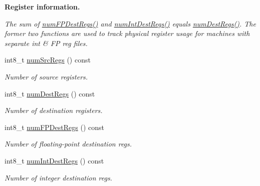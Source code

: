 \begin{Indent}{\bf Register information.}\par
{\em \label{_amgrp94a7efef3e08518a5eecac7cdd492527}
 The sum of \hyperlink{classStaticInst_a7ec0ad00d322ae83bc5fae443ef04323}{numFPDestRegs()} and \hyperlink{classStaticInst_a3935410f8201e0afd0f8e459f838b463}{numIntDestRegs()} equals \hyperlink{classStaticInst_ab7e23352b3d45a982dfeb799030f87d0}{numDestRegs()}. The former two functions are used to track physical register usage for machines with separate int \& FP reg files. }\begin{DoxyCompactItemize}
\item 
int8\_\-t \hyperlink{classStaticInst_a3902ecc708a6f28e94ee9aa975692915}{numSrcRegs} () const 
\begin{DoxyCompactList}\small\item\em Number of source registers. \item\end{DoxyCompactList}\item 
int8\_\-t \hyperlink{classStaticInst_ab7e23352b3d45a982dfeb799030f87d0}{numDestRegs} () const 
\begin{DoxyCompactList}\small\item\em Number of destination registers. \item\end{DoxyCompactList}\item 
int8\_\-t \hyperlink{classStaticInst_a7ec0ad00d322ae83bc5fae443ef04323}{numFPDestRegs} () const 
\begin{DoxyCompactList}\small\item\em Number of floating-\/point destination regs. \item\end{DoxyCompactList}\item 
int8\_\-t \hyperlink{classStaticInst_a3935410f8201e0afd0f8e459f838b463}{numIntDestRegs} () const 
\begin{DoxyCompactList}\small\item\em Number of integer destination regs. \item\end{DoxyCompactList}\end{DoxyCompactItemize}
\end{Indent}
